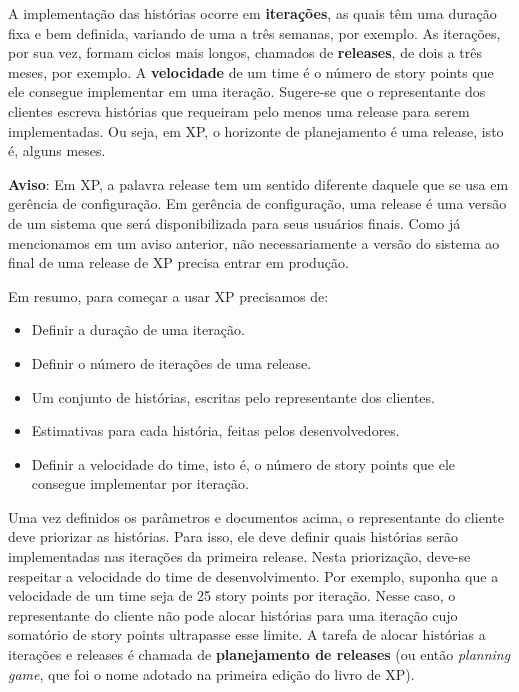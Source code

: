 \documentclass[
  11pt,
  twoside]{book}
\begin{document}
 A implementação das histórias
ocorre em \textbf{iterações}, as quais têm uma duração fixa e bem
definida, variando de uma a três semanas, por exemplo. As iterações, por
sua vez, formam ciclos mais longos, chamados de \textbf{releases}, de
dois a três meses, por exemplo. A \textbf{velocidade} de um time é o
número de story points que ele consegue implementar em uma iteração.
Sugere-se que o representante dos clientes escreva histórias que
requeiram pelo menos uma release para serem implementadas. Ou seja, em
XP, o horizonte de planejamento é uma release, isto é, alguns meses.

\textbf{Aviso}: Em XP, a palavra release tem um sentido diferente
daquele que se usa em gerência de configuração. Em gerência de
configuração, uma release é uma versão de um sistema que será
disponibilizada para seus usuários finais. Como já mencionamos em um
aviso anterior, não necessariamente a versão do sistema ao final de uma
release de XP precisa entrar em produção.

Em resumo, para começar a usar XP precisamos de:

\begin{itemize}
\item
  Definir a duração de uma iteração.
\item
  Definir o número de iterações de uma release.
\item
  Um conjunto de histórias, escritas pelo representante dos clientes.
\item
  Estimativas para cada história, feitas pelos desenvolvedores.
\item
  Definir a velocidade do time, isto é, o número de story points que ele
  consegue implementar por iteração.
\end{itemize}

Uma vez definidos os parâmetros e documentos acima, o representante do
cliente deve priorizar as histórias. Para isso, ele deve definir quais
histórias serão implementadas nas iterações da primeira release. Nesta
priorização, deve-se respeitar a velocidade do time de desenvolvimento.
Por exemplo, suponha que a velocidade de um time seja de 25 story points
por iteração. Nesse caso, o representante do cliente não pode alocar
histórias para uma iteração cujo somatório de story points ultrapasse
esse limite. A tarefa de alocar histórias a iterações e releases é
chamada de \textbf{planejamento de releases} (ou então \emph{planning
game}, que foi o nome adotado na primeira edição do livro de XP).
\end{document}
